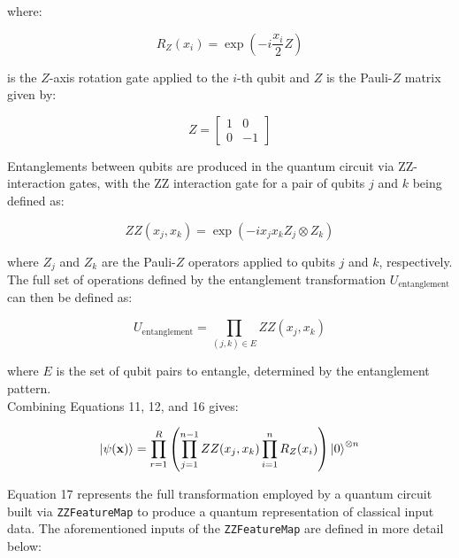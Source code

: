 \documentclass[11pt, oneside]{article}   	%
\begin{document}
\noindent where:

\begin{equation}
	R_Z(x_i) = \exp\left(-i \frac{x_i}{2} Z\right)
\end{equation}

\noindent is the $Z$-axis rotation gate applied to the $i$-th qubit and $Z$ is the Pauli-$Z$ matrix given by:

\begin{equation}
	Z = 
	\begin{bmatrix}
		1 & 0 \\
		0 & -1
	\end{bmatrix}
\end{equation}

Entanglements between qubits are produced in the quantum circuit via ZZ-interaction gates, with the ZZ interaction gate for a pair of qubits $j$ and $k$ being defined as:

\begin{equation}
	ZZ(x_j, x_k) = \exp\left(-i x_j x_k Z_j \otimes Z_k\right)
\end{equation}

\noindent where $Z_j$ and $Z_k$ are the Pauli-$Z$ operators applied to qubits $j$ and $k$, respectively. The full set of operations defined by the entanglement transformation $U_{\text{entanglement}}$ can then be defined as:

\begin{equation}
	U_{\text{entanglement}} = \prod_{(j,k) \in E} ZZ(x_j, x_k)
\end{equation}

\noindent where $E$ is the set of qubit pairs to entangle, determined by the entanglement pattern.\\

Combining Equations 11, 12, and 16 gives:

\begin{equation}
	\ket{\psi(\mathbf{x})} = \prod_{r=1}^R \left( \prod_{j=1}^{n-1} ZZ(x_j, x_k) \prod_{i=1}^n R_Z(x_i) \right) \ket{0}^{\otimes n}
\end{equation}

Equation 17 represents the full transformation employed by a quantum circuit built via \texttt{ZZFeatureMap} to produce a quantum representation of classical input data. The aforementioned inputs of the \texttt{ZZFeatureMap} are defined in more detail below:
\end{document}
